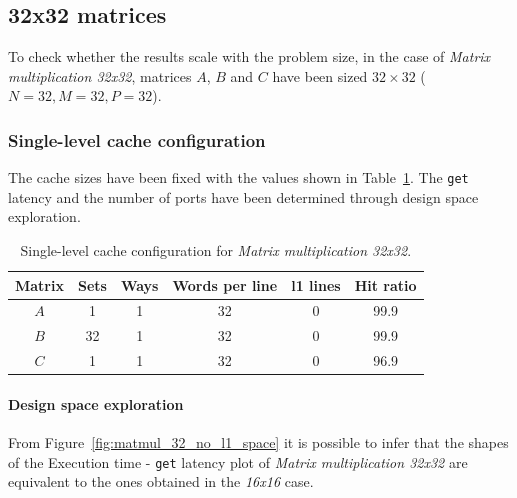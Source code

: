 \documentclass[11pt,a4paper,oneside]{memoir}
\begin{document}
\subsection{32x32 matrices}
To check whether the results scale with the problem size, in the case of
\emph{Matrix multiplication 32x32}, matrices $A$, $B$ and $C$ have been sized
$32 \times 32$ ($N = 32, M = 32, P = 32$).

\subsubsection{Single-level cache configuration}
The cache sizes have been fixed with the values shown in
Table~\ref{tab:matmul_32_no_l1_config}. The \texttt{get} latency and the number
of ports have been determined through design space exploration.

\begin{table}[H]
	\begin{center}
		\begin{tabular}{cccccc}
			\hline
			\rowcolor{gray!50}
			\textbf{Matrix} & \textbf{Sets} & \textbf{Ways} &
			\textbf{Words per line} & \textbf{\ac{l1} lines} &
			\textbf{Hit ratio} \\
			\hline
			$A$ & 1 & 1 & 32 & 0 & 99.9 \\
			\rowcolor{gray!25}
			$B$ & 32 & 1 & 32 & 0 & 99.9 \\
			$C$ & 1 & 1 & 32 & 0 & 96.9 \\
			\hline
		\end{tabular}
	\end{center}
	\caption{Single-level cache configuration for \emph{Matrix
	multiplication 32x32}.}
	\label{tab:matmul_32_no_l1_config}
\end{table}

\paragraph{Design space exploration}
From Figure~\ref{fig:matmul_32_no_l1_space} it is possible to infer that the
shapes of the Execution time - \texttt{get} latency plot of \emph{Matrix
multiplication 32x32} are equivalent to the ones obtained in the \emph{16x16}
case.
\end{document}
